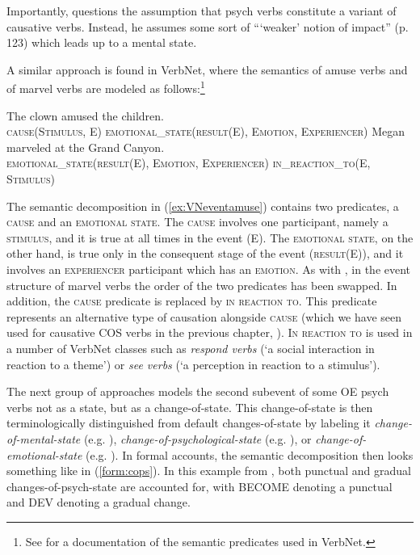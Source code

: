 \noindent Importantly, \citet{Tantos.2006} questions the assumption that psych verbs constitute a variant of causative verbs. Instead, he assumes some sort of ```weaker' notion of impact'' (p. 123) which leads up to a mental state. 

A similar approach is found in VerbNet, where the semantics of amuse verbs and of marvel verbs are modeled as follows:\footnote{See \citet{Kipper.2005} for a documentation of the semantic predicates used in VerbNet.}

\begin{exe}\sloppy\raggedright
    \ex \label{ex:VNeventamuse} The clown amused the children. \\ 
    \textsc{cause(Stimulus, E) emotional\_state(result(E), E\-motion, Experien\-cer)}
    \ex \label{ex:VNeventmarvel} 
     Megan marveled at the Grand Canyon. \\ 
    \textsc{emotional\_state(result(E), \mbox{Emotion}, Experiencer) \mbox{in\_reaction\_to(}E, Stimulus)}
\end{exe} 

\noindent The semantic decomposition in (\ref{ex:VNeventamuse}) contains two predicates, a \textsc{cause} and an \textsc{emotional state}. The \textsc{cause} involves one participant, namely a \textsc{stimulus}, and it is true at all times in the event (E). The \textsc{emotional state}, on the other hand, is true only in the consequent stage of the event (\textsc{result(E)}), and it involves an \textsc{experiencer} participant which has an \textsc{emotion}.
As with \citet{Tantos.2006}, in the event structure of marvel verbs the order of the two predicates has been swapped. In addition, the \textsc{cause} predicate is replaced by \textsc{in reaction to}.
This predicate represents an alternative type of causation alongside \textsc{cause} (which we have seen used for causative COS verbs in the previous chapter, ). \textsc{In reaction to} is used in a number of VerbNet classes such as \textit{respond verbs} (`a social interaction in reaction to a theme') or \textit{see verbs} (`a perception in reaction to a stimulus'). 

\label{sec:psy-input-prev-caus-cops}
The next group of approaches models the second subevent of some OE psych verbs not as a state, but as a change-of-state. This change-of-state is then terminologically distinguished from default changes-of-state by labeling it \textit{change-of-mental-state} (e.g. \citealt{Hartshorne.2016}), \textit{change-of-psychological-state} (e.g. \citealt{Prakasam.2018}), or \textit{change-of-emotional-state} (e.g. \citealt{Wanner.1999}). In formal accounts, the semantic decomposition then looks something like in (\ref{form:cops}). In this example from \citet[68--79]{Rapp.1997}, both punctual and gradual changes-of-psych-state are accounted for, with BECOME denoting a punctual and DEV denoting a gradual change.

